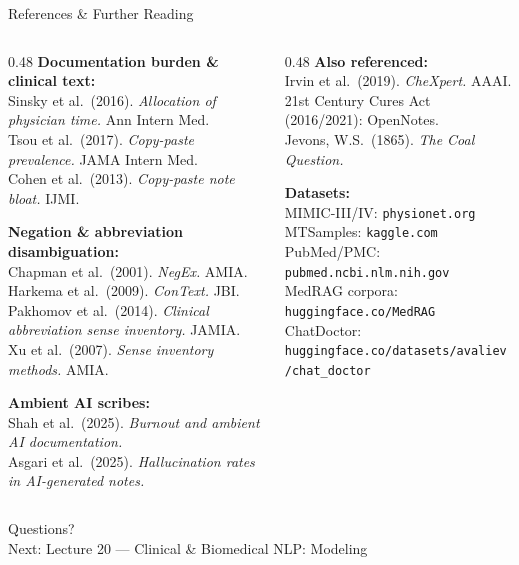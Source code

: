 \documentclass[aspectratio=169,11pt]{beamer}
\begin{document}
\begin{frame}{References \& Further Reading}
\tiny
\begin{columns}[T]
\begin{column}{0.48\textwidth}
\textbf{Documentation burden \& clinical text:}\\
Sinsky et al.\ (2016). \emph{Allocation of physician time.} Ann Intern Med.\\
Tsou et al.\ (2017). \emph{Copy-paste prevalence.} JAMA Intern Med.\\
Cohen et al.\ (2013). \emph{Copy-paste note bloat.} IJMI.

\vspace{0.1em}
\textbf{Negation \& abbreviation disambiguation:}\\
Chapman et al.\ (2001). \emph{NegEx.} AMIA.\\
Harkema et al.\ (2009). \emph{ConText.} JBI.\\
Pakhomov et al.\ (2014). \emph{Clinical abbreviation sense inventory.} JAMIA.\\
Xu et al.\ (2007). \emph{Sense inventory methods.} AMIA.

\vspace{0.1em}
\textbf{Ambient AI scribes:}\\
Shah et al.\ (2025). \emph{Burnout and ambient AI documentation.}\\
Asgari et al.\ (2025). \emph{Hallucination rates in AI-generated notes.}
\end{column}
\begin{column}{0.48\textwidth}
\textbf{Also referenced:}\\
Irvin et al.\ (2019). \emph{CheXpert.} AAAI.\\
21st Century Cures Act (2016/2021): OpenNotes.\\
Jevons, W.S.\ (1865). \emph{The Coal Question.}

\vspace{0.1em}
\textbf{Datasets:}\\
MIMIC-III/IV: \texttt{physionet.org}\\
MTSamples: \texttt{kaggle.com}\\
PubMed/PMC: \texttt{pubmed.ncbi.nlm.nih.gov}\\
MedRAG corpora: \texttt{huggingface.co/MedRAG}\\
ChatDoctor: \texttt{huggingface.co/datasets/avaliev/chat\_doctor}
\end{column}
\end{columns}
\end{frame}

\begin{frame}[standout]
  Questions?\\[1em]
  {\small Next: Lecture 20 --- Clinical \& Biomedical NLP: Modeling}
\end{frame}
\end{document}
